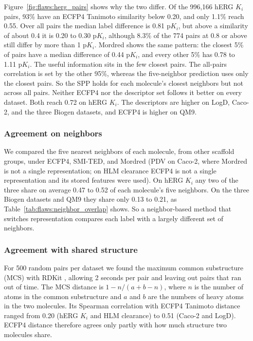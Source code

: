 Figure~\ref{fig:flaws:herg_pairs} shows why the two differ. Of the 996,166 hERG $K_i$ pairs, 93\% have an ECFP4 Tanimoto similarity below 0.20, and only 1.1\% reach 0.55. Over all pairs the median label difference is 0.81 p$K_i$, but above a similarity of about 0.4 it is 0.20 to 0.30 p$K_i$, although 8.3\% of the 774 pairs at 0.8 or above still differ by more than 1 p$K_i$. Mordred shows the same pattern: the closest 5\% of pairs have a median difference of 0.44 p$K_i$, and every other 5\% has 0.78 to 1.11 p$K_i$. The useful information sits in the few closest pairs. The all-pairs correlation is set by the other 95\%, whereas the five-neighbor prediction uses only the closest pairs. So the SPP holds for each molecule's closest neighbors but not across all pairs. Neither ECFP4 nor the descriptor set follows it better on every dataset. Both reach 0.72 on hERG $K_i$. The descriptors are higher on LogD, Caco-2, and the three Biogen datasets, and ECFP4 is higher on QM9.

\subsubsection{Agreement on neighbors}
We compared the five nearest neighbors of each molecule, from other scaffold groups, under ECFP4, SMI-TED, and Mordred (PDV on Caco-2, where Mordred is not a single representation; on HLM clearance ECFP4 is not a single representation and its stored features were used). On hERG $K_i$ any two of the three share on average 0.47 to 0.52 of each molecule's five neighbors. On the three Biogen datasets and QM9 they share only 0.13 to 0.21, as Table~\ref{tab:flaws:neighbor_overlap} shows. So a neighbor-based method that switches representation compares each label with a largely different set of neighbors.

\subsubsection{Agreement with shared structure}
For 500 random pairs per dataset we found the maximum common substructure (MCS) with RDKit \citep{rdkit}, allowing 2 seconds per pair and leaving out pairs that ran out of time. The MCS distance is $1 - n/(a+b-n)$, where $n$ is the number of atoms in the common substructure and $a$ and $b$ are the numbers of heavy atoms in the two molecules. Its Spearman correlation with ECFP4 Tanimoto distance ranged from 0.20 (hERG $K_i$ and HLM clearance) to 0.51 (Caco-2 and LogD). ECFP4 distance therefore agrees only partly with how much structure two molecules share.

